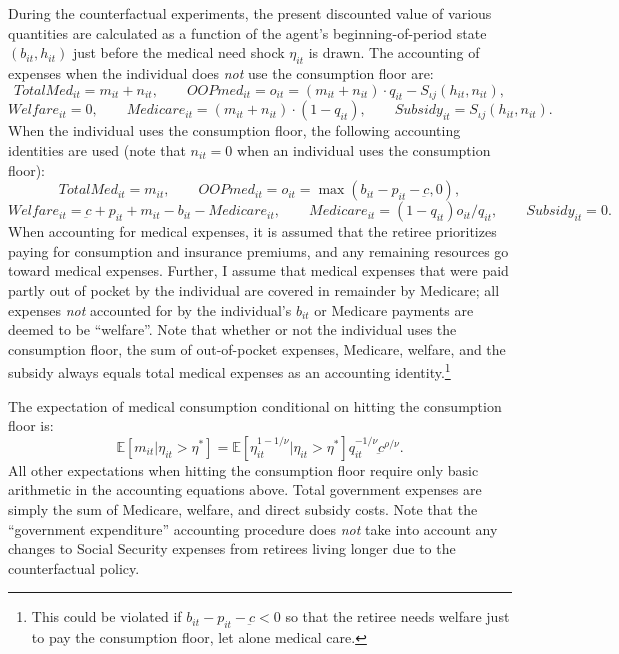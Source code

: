 \documentclass[12pt,pdftex,letterpaper]{article}
\newcommand{\E}{\mathbb{E}}
\newcommand{\Type}{\iota}
\newcommand{\Health}{h}
\newcommand{\Con}{c}
\newcommand{\Care}{m}
\newcommand{\Invst}{n}
\newcommand{\Bank}{b}
\newcommand{\Premium}{p}
\newcommand{\Copay}{q}
\newcommand{\OOP}{o}
\newcommand{\Subsidy}{S}
\newcommand{\ConFloor}{\underbar{\Con}}
\newcommand{\CRRAcon}{\rho}
\newcommand{\CRRAcare}{\nu}
\newcommand{\Age}{j}
\newcommand{\MedShk}{\eta}
\begin{document}
During the counterfactual experiments, the present discounted value of various quantities are calculated as a function of the agent's beginning-of-period state $(\Bank_{it},\Health_{it})$ just before the medical need shock $\MedShk_{it}$ is drawn.  The accounting of expenses when the individual does \textit{not} use the consumption floor are:
\begin{equation}
TotalMed_{it} = \Care_{it} + \Invst_{it}, \qquad OOPmed_{it} = \OOP_{it} =  (\Care_{it} + \Invst_{it})\cdot \Copay_{it} - \Subsidy_{\Type \Age}(\Health_{it},\Invst_{it}),
\end{equation}
\begin{equation*}
Welfare_{it} = 0, \qquad Medicare_{it} = (\Care_{it} + \Invst_{it})\cdot(1-\Copay_{it}), \qquad Subsidy_{it} = \Subsidy_{\Type \Age}(\Health_{it},\Invst_{it}).
\end{equation*}
When the individual uses the consumption floor, the following accounting identities are used (note that $\Invst_{it}=0$ when an individual uses the consumption floor):
\begin{equation}
TotalMed_{it} = \Care_{it}, \qquad OOPmed_{it} = \OOP_{it} =  \max(\Bank_{it} - \Premium_{it} - \ConFloor, 0),
\end{equation}
\begin{equation*}
Welfare_{it} = \ConFloor + \Premium_{it} + \Care_{it} - \Bank_{it} - Medicare_{it}, \qquad Medicare_{it} = (1 - \Copay_{it}) \OOP_{it}/\Copay_{it}, \qquad Subsidy_{it} = 0.
\end{equation*}
When accounting for medical expenses, it is assumed that the retiree prioritizes paying for consumption and insurance premiums, and any remaining resources go toward medical expenses.  Further, I assume that medical expenses that were paid partly out of pocket by the individual are covered in remainder by Medicare; all expenses \textit{not} accounted for by the individual's $\Bank_{it}$ or Medicare payments are deemed to be ``welfare''.  Note that whether or not the individual uses the consumption floor, the sum of out-of-pocket expenses, Medicare, welfare, and the subsidy always equals total medical expenses as an accounting identity.\footnote{This could be violated if $\Bank_{it} - \Premium_{it} - \ConFloor < 0$ so that the retiree needs welfare just to pay the consumption floor, let alone medical care.}

The expectation of medical consumption conditional on hitting the consumption floor is:
\begin{equation}
\E [\Care_{it} | \MedShk_{it} > \MedShk^*] = \E [\MedShk_{it}^{1-1/\CRRAcare} | \MedShk_{it} > \MedShk^*] \Copay_{it}^{-1/\CRRAcare} \ConFloor^{\CRRAcon/\CRRAcare}.
\end{equation}
All other expectations when hitting the consumption floor require only basic arithmetic in the accounting equations above.  Total government expenses are simply the sum of Medicare, welfare, and direct subsidy costs.  Note that the ``government expenditure'' accounting procedure does \textit{not} take into account any changes to Social Security expenses from retirees living longer due to the counterfactual policy.
\end{document}
